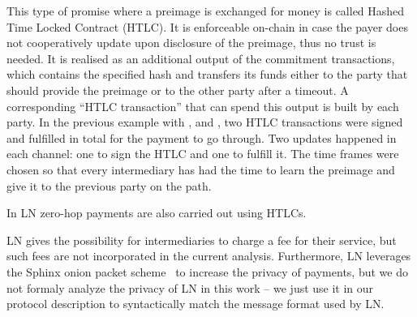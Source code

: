     This type of promise where a preimage is exchanged for money is called
    Hashed Time Locked Contract (HTLC). It is enforceable on-chain in case the
    payer does not cooperatively update upon disclosure of the preimage, thus no
    trust is needed. It is realised as an additional output of the commitment
    transactions, which contains the specified hash and transfers its funds
    either to the party that should provide the preimage or to the other party
    after a timeout. A corresponding ``HTLC transaction'' that can spend this
    output is built by each party. In the previous example with \alice{}, \bob{}
    and \charlie, two HTLC transactions were signed and fulfilled in total for
    the payment to go through. Two updates happened in each channel: one to sign
    the HTLC and one to fulfill it. The time frames were chosen so that every
    intermediary has had the time to learn the preimage and give it to the
    previous party on the path.

    In LN zero-hop payments are also carried out using HTLCs.

    LN gives the possibility for intermediaries to charge a fee for their
    service, but such fees are not incorporated in the current analysis.
    Furthermore, LN leverages the Sphinx onion packet scheme~\cite{sphinx} to
    increase the privacy of payments, but we do not formaly analyze the privacy
    of LN in this work -- we just use it in our protocol description to
    syntactically match the message format used by LN.

